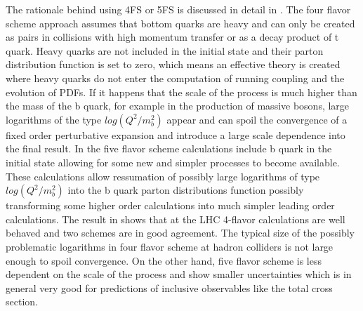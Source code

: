 \par The rationale behind using 4FS or 5FS is discussed in detail in \cite{Maltoni:2012pa}. The four flavor scheme approach assumes that bottom quarks are heavy and can only be created as pairs in collisions with high momentum transfer or as a decay product of t quark. Heavy quarks are not included in the initial state and their parton distribution function is set to zero, which means an effective theory is created where heavy quarks do not enter the computation of running coupling and the evolution of PDFs. If it happens that the scale of the process is much higher than the mass of the b quark, for example in the production of massive bosons, large logarithms of the type $log(Q^2/m_b^2)$ appear and can spoil the convergence of a fixed order perturbative expansion and introduce a large scale dependence into the final result. In the five flavor scheme calculations include b quark in the initial state allowing for some new and simpler processes to become available. These calculations allow ressumation of possibly large logarithms of type $log(Q^2/m_b^2)$ into the b quark parton distributions function possibly transforming some higher order calculations into much simpler leading order calculations.  
The result in \cite{Maltoni:2012pa} shows that at the LHC 4-flavor calculations are well behaved and two schemes are in good agreement. The typical size of the possibly problematic logarithms in four flavor scheme at hadron colliders is not large enough to spoil convergence. On the other hand, five flavor scheme is less dependent on the scale of the process and show smaller uncertainties which is in general very good for predictions of inclusive observables like the total cross section.  

